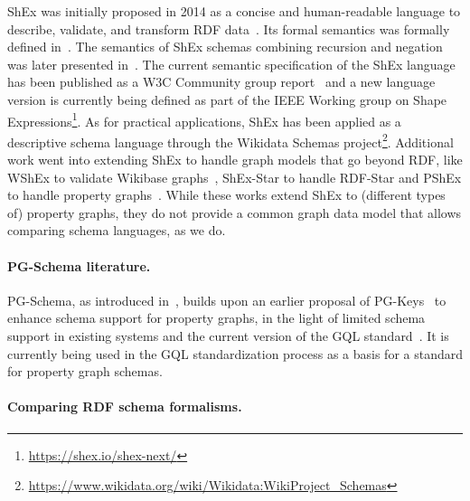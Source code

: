 ShEx was initially proposed in 2014 as a concise and human-readable language to describe, validate, and transform RDF data~\cite{PGS14}.
Its formal semantics was formally defined in~\cite{SBG15}.
The semantics of ShEx schemas combining recursion and negation was later presented in~\cite{BGP17}.
The current semantic specification of the ShEx language has been published as a W3C Community group report~\cite{PBGK19} and a new language version is currently being defined as part of the IEEE Working group on Shape Expressions\footnote{\url{https://shex.io/shex-next/}}. As for practical applications, ShEx has been applied as a descriptive schema language through the
Wikidata Schemas project\footnote{\url{https://www.wikidata.org/wiki/Wikidata:WikiProject_Schemas}}.
Additional work went into extending ShEx to handle graph models that go beyond
RDF, like WShEx to validate Wikibase graphs~\cite{L22}, ShEx-Star to handle
RDF-Star and PShEx to handle property graphs~\cite{L24}. While these works
extend ShEx to (different types of) property graphs, they do not provide a
common graph data model  that
allows comparing schema languages, as we do.


\paragraph{PG-Schema literature.}

PG-Schema, as introduced in~\cite{ABDF23}, builds upon an earlier proposal of PG-Keys~\cite{ABDF21} to enhance schema support for property graphs, in the light of limited schema support in existing systems and the current version of the GQL standard~\cite{GQL}. It is currently being used in the GQL standardization process as a basis for a standard for property graph schemas.


\paragraph{Comparing RDF schema formalisms.}

